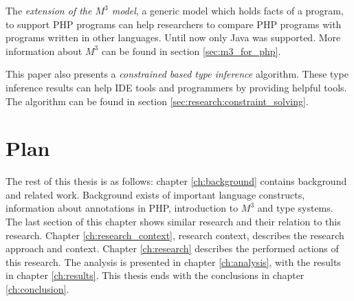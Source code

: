 \documentclass[../main.tex]{subfiles}
\begin{document}
		The \textit{extension of the $M^3$ model}, a generic model which holds facts of a program, to support PHP programs can help researchers to compare PHP programs with programs written in other languages. 
		Until now only Java was supported.
		More information about $M^3$ can be found in section \ref{sec:m3_for_php}.
		
		This paper also presents a \textit{constrained based type inference} algorithm.
		These type inference results can help IDE tools and programmers by providing helpful tools.
		The algorithm can be found in section \ref{sec:research:constraint_solving}.
		
        
        
    
    \section{Plan} %
        The rest of this thesis is as follows:
        chapter \ref{ch:background} contains background and related work.
        Background exists of important language constructs, information about annotations in PHP, introduction to $M^3$ and type systems. 
        The last section of this chapter shows similar research and their relation to this research.
        Chapter \ref{ch:research_context}, research context, describes the research approach and context.
        Chapter \ref{ch:research} describes the performed actions of this research. 
        The analysis is presented in chapter \ref{ch:analysis}, with the results in chapter \ref{ch:results}.
        This thesis ends with the conclusions in chapter \ref{ch:conclusion}.
        
        
    
        
\end{document}
